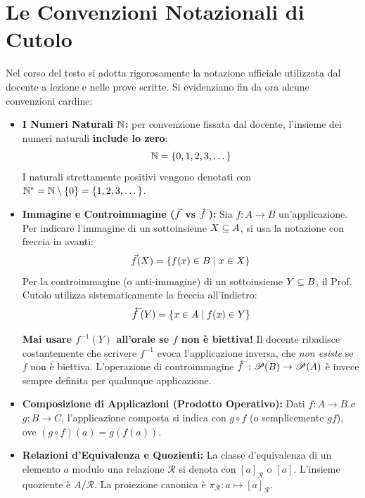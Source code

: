 \section*{Le Convenzioni Notazionali di Cutolo}
Nel corso del testo si adotta rigorosamente la notazione ufficiale utilizzata dal docente a lezione e nelle prove scritte. Si evidenziano fin da ora alcune convenzioni cardine:
\begin{itemize}
    \item \textbf{I Numeri Naturali $\mathbb{N}$:} per convenzione fissata dal docente, l'insieme dei numeri naturali \textbf{include lo zero}:
    \[
        \mathbb{N} = \{0, 1, 2, 3, \dots\}
    \]
    I naturali strettamente positivi vengono denotati con $\mathbb{N}^* = \mathbb{N} \setminus \{0\} = \{1, 2, 3, \dots\}$.
    \item \textbf{Immagine e Controimmagine ($\vec{f}$ vs $\antivecf$):} Sia $f: A \to B$ un'applicazione. Per indicare l'immagine di un sottoinsieme $X \subseteq A$, si usa la notazione con freccia in avanti:
    \[
        \vec{f}(X) = \{f(x) \in B \mid x \in X\}
    \]
    Per la controimmagine (o anti-immagine) di un sottoinsieme $Y \subseteq B$, il Prof. Cutolo utilizza sistematicamente la freccia all'indietro:
    \[
        \antivecf(Y) = \{x \in A \mid f(x) \in Y\}
    \]
    \begin{avvisoCutolo}
        \textbf{Mai usare $f^{-1}(Y)$ all'orale se $f$ non è biettiva!} Il docente ribadisce costantemente che scrivere $f^{-1}$ evoca l'applicazione inversa, che \emph{non esiste} se $f$ non è biettiva. L'operazione di controimmagine $\antivecf: \P(B) \to \P(A)$ è invece sempre definita per qualunque applicazione.
    \end{avvisoCutolo}
    \item \textbf{Composizione di Applicazioni (Prodotto Operativo):} Dati $f: A \to B$ e $g: B \to C$, l'applicazione composta si indica con $g \circ f$ (o semplicemente $gf$), ove $(g \circ f)(a) = g(f(a))$.
    \item \textbf{Relazioni d'Equivalenza e Quozienti:} La classe d'equivalenza di un elemento $a$ modulo una relazione $\mathcal{R}$ si denota con $[a]_\mathcal{R}$ o $[a]$. L'insieme quoziente è $A/\mathcal{R}$. La proiezione canonica è $\pi_\mathcal{R}: a \mapsto [a]_\mathcal{R}$.
\end{itemize}


